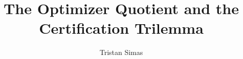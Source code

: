 \documentclass[acmsmall,review]{acmart}
\title{The Optimizer Quotient and the Certification Trilemma}
\author{Tristan Simas}
\affiliation{
  \institution{McGill University}
  \city{Montreal}
  \state{Quebec}
  \country{Canada}
}
\begin{document}
\begin{abstract}

\end{abstract}

\maketitle



















\end{document}
